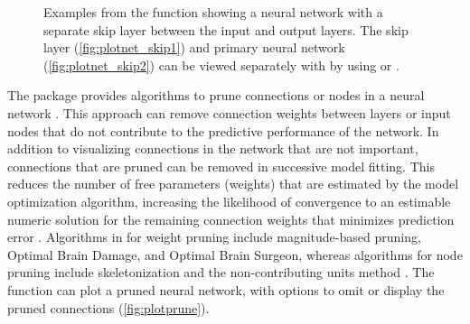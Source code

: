 \documentclass[article,shortnames]{jss}
\begin{document}
\begin{figure}[!ht]
\caption{Examples from the  function showing a neural network with a separate skip layer between the input and output layers.  The skip layer (\ref{fig:plotnet_skip1}) and primary neural network (\ref{fig:plotnet_skip2}) can be viewed separately with  by using  or .}
\label{fig:plotnet_skip}
\end{figure}

The  package provides algorithms to prune connections or nodes in a neural network \citep{Bergmeir12}.  This approach can remove connection weights between layers or input nodes that do not contribute to the predictive performance of the network.  In addition to visualizing connections in the network that are not important, connections that are pruned can be removed in successive model fitting.  This reduces the number of free parameters (weights) that are  estimated by the model optimization algorithm, increasing the likelihood of convergence to an estimable numeric solution for the remaining connection weights that minimizes prediction error \citep[i.e., model identifiability,][]{Ellenius00}. Algorithms in  for weight pruning include magnitude-based pruning, Optimal Brain Damage, and Optimal Brain Surgeon, whereas algorithms for node pruning include skeletonization and the non-contributing units method \citep{Zell98}.  The  function can plot a pruned neural network, with options to omit or display the pruned connections (\cref{fig:plotprune}).
\end{document}
